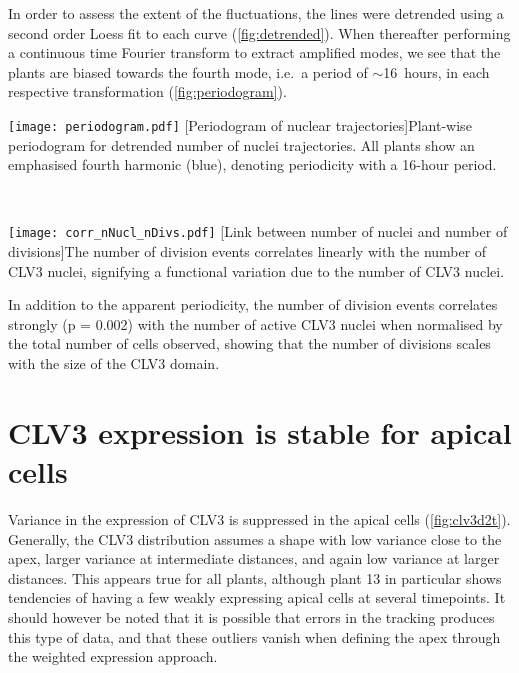 In order to assess the extent of the fluctuations, the lines were detrended using
a second order Loess fit to each curve (\cref{fig:detrended}). When thereafter performing a continuous time
Fourier transform to extract amplified modes, we see that the plants are
biased towards the fourth mode, i.e.\ a period of $\sim$16~hours, in each
respective transformation (\cref{fig:periodogram}).
\vspace{2em}

\begin{minipage}{\textwidth}
  \begin{minipage}[t]{0.47\textwidth}
    \centering
  \texttt{[image: periodogram.pdf]}
    [Periodogram of nuclear trajectories]{Plant-wise periodogram for detrended number of nuclei
      trajectories. All plants show an emphasised fourth harmonic (blue),
      denoting periodicity with a 16-hour period.}
    \label{fig:periodogram}
  \end{minipage}~~
  \begin{minipage}[t]{.47\textwidth}
    \centering
    \texttt{[image: corr\_nNucl\_nDivs.pdf]}
    [Link between number of nuclei and number of divisions]{The number of division events correlates linearly
      with the number of CLV3 nuclei, signifying a functional variation due
      to the number of CLV3 nuclei.
    }
  \end{minipage}
\end{minipage}

\vspace{2em}
In addition to the apparent periodicity, the number of division events
correlates strongly (p = 0.002) with the number of active CLV3 nuclei when normalised by the
total number of cells observed, showing that the number of divisions scales with
the size of the CLV3 domain.


\section{CLV3 expression is stable for apical cells}
Variance in the expression of CLV3 is suppressed in the apical cells
(\cref{fig:clv3d2t}). Generally, the CLV3 distribution assumes a  
shape with low variance close to the apex, larger variance at intermediate
distances, and again low variance at larger distances. 
This appears true for all plants, although plant
13 in particular shows tendencies of having a few weakly expressing apical cells at
several timepoints. It should however be noted that it is possible that errors
in the tracking produces this type of data, and that these outliers vanish when
defining the apex through the weighted expression approach. 

